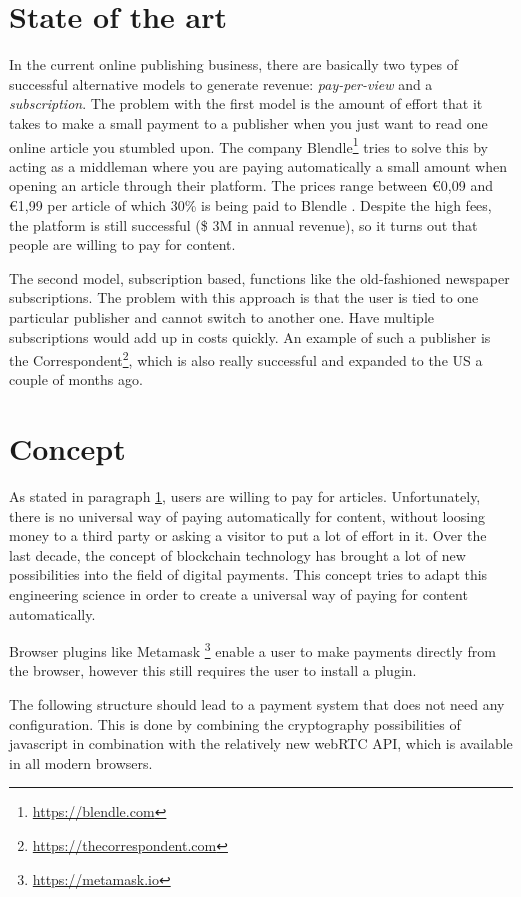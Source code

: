 \documentclass[a4paper]{article}
\begin{document}
\section{State of the art}
\label{stateoftheart}
In the current online publishing business, there are basically two types of successful alternative models to generate revenue: \textit{pay-per-view }and a \textit{subscription}. The problem with the first model is the amount of effort that it takes to make a small payment to a publisher when you just want to read one online article you stumbled upon. The company Blendle\footnote{\url{https://blendle.com}} tries to solve this by acting as a middleman where you are paying automatically a small amount when opening an article through their platform. The prices range between €0,09 and €1,99 per article of which 30\% is being paid to Blendle . Despite the high fees, the platform is still successful (\$ 3M in annual revenue), so it turns out that people are willing to pay for content.

The second model, subscription based, functions like the old-fashioned newspaper subscriptions. The problem with this approach is that the user is tied to one particular publisher and cannot switch to another one. Have multiple subscriptions would add up in costs quickly. An example of such a publisher is the Correspondent\footnote{\url{https://thecorrespondent.com}}, which is also really successful and expanded to the US a couple of months ago.

\section {Concept}
As stated in paragraph \ref{stateoftheart}, users are willing to pay for articles. Unfortunately, there is no universal way of paying automatically for content, without loosing money to a third party or asking a visitor to put a lot of effort in it. Over the last decade, the concept of blockchain technology has brought a lot of new possibilities into the field of digital payments. This concept tries to adapt this engineering science in order to create a universal way of paying for content automatically.

Browser plugins like Metamask \footnote{\url{https://metamask.io}} enable a user to make payments directly from the browser, however this still requires the user to install a plugin.

The following structure should lead to a payment system that does not need any configuration. This is done by combining the cryptography possibilities of javascript in combination with the relatively new webRTC API, which is available in all modern browsers.
\end{document}
